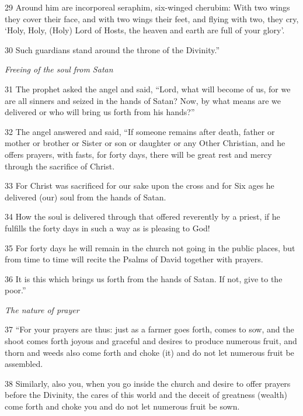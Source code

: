 \par 29 Around him are incorporeal seraphim, six-winged cherubim: With two wings they cover their face, and with two wings their feet, and flying with two, they cry, ‘Holy, Holy, (Holy) Lord of Hosts, the heaven and earth are full of your glory’.

\par 30 Such guardians stand around the throne of the Divinity.”

\par \textit{Freeing of the soul from Satan}

\par 31 The prophet asked the angel and said, “Lord, what will become of us, for we are all sinners and seized in the hands of Satan? Now, by what means are we delivered or who will bring us forth from his hands?”

\par 32 The angel answered and said, “If someone remains after death, father or mother or brother or Sister or son or daughter or any Other Christian, and he offers prayers, with fasts, for forty days, there will be great rest and mercy through the sacrifice of Christ.

\par 33 For Christ was sacrificed for our sake upon the cross and for Six ages he delivered (our) soul from the hands of Satan.

\par 34 How the soul is delivered through that offered reverently by a priest, if he fulfills the forty days in such a way as is pleasing to God!

\par 35 For forty days he will remain in the church not going in the public places, but from time to time will recite the Psalms of David together with prayers.

\par 36 It is this which brings us forth from the hands of Satan. If not, give to the poor.”

\par \textit{The nature of prayer}

\par 37 “For your prayers are thus: just as a farmer goes forth, comes to sow, and the shoot comes forth joyous and graceful and desires to produce numerous fruit, and thorn and weeds also come forth and choke (it) and do not let numerous fruit be assembled.

\par 38 Similarly, also you, when you go inside the church and desire to offer prayers before the Divinity, the cares of this world and the deceit of greatness (wealth) come forth and choke you and do not let numerous fruit be sown.

